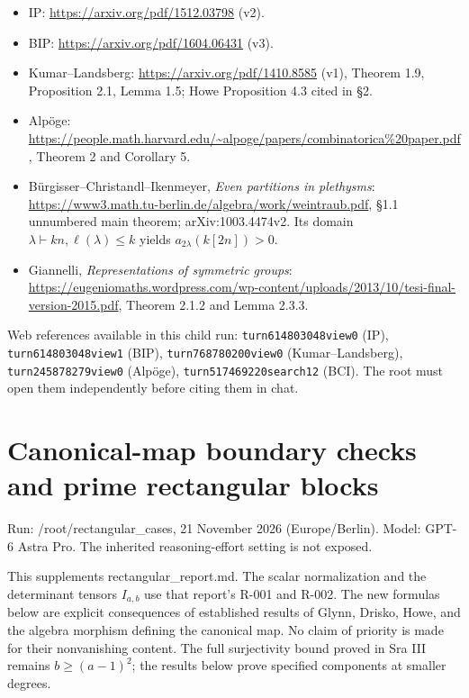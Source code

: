 \documentclass[
  10pt,
]{article}
\providecommand{\tightlist}{%
  \setlength{\itemsep}{0pt}\setlength{\parskip}{0pt}}
\providecommand{\tightlist}{\setlength{\itemsep}{0pt}\setlength{\parskip}{0pt}}
\begin{document}
\begin{itemize}
\tightlist
\item
  IP: \url{https://arxiv.org/pdf/1512.03798} (v2).
\item
  BIP: \url{https://arxiv.org/pdf/1604.06431} (v3).
\item
  Kumar--Landsberg: \url{https://arxiv.org/pdf/1410.8585} (v1), Theorem
  1.9, Proposition 2.1, Lemma 1.5; Howe Proposition 4.3 cited in §2.
\item
  Alpöge:
  \url{https://people.math.harvard.edu/~alpoge/papers/combinatorica\%20paper.pdf},
  Theorem 2 and Corollary 5.
\item
  Bürgisser--Christandl--Ikenmeyer, \emph{Even partitions in plethysms}:
  \url{https://www3.math.tu-berlin.de/algebra/work/weintraub.pdf}, §1.1
  unnumbered main theorem; arXiv:1003.4474v2. Its domain
  \(\lambda\vdash kn,\ell(\lambda)\le k\) yields
  \(a_{2\lambda}(k[2n])>0\).
\item
  Giannelli, \emph{Representations of symmetric groups}:
  \url{https://eugeniomaths.wordpress.com/wp-content/uploads/2013/10/tesi-final-version-2015.pdf},
  Theorem 2.1.2 and Lemma 2.3.3.
\end{itemize}

Web references available in this child run:
\texttt{\small turn614803048view0} (IP),
\texttt{\small turn614803048view1} (BIP),
\texttt{\small turn768780200view0} (Kumar--Landsberg),
\texttt{\small turn245878279view0} (Alpöge),
\texttt{\small turn517469220search12} (BCI). The root must open them
independently before citing them in chat.

\section{Canonical-map boundary checks and prime rectangular
blocks}\label{canonical-map-boundary-checks-and-prime-rectangular-blocks}

Run: /root/rectangular\_cases, 21 November 2026 (Europe/Berlin). Model:
GPT-6 Astra Pro. The inherited reasoning-effort setting is not exposed.

This supplements rectangular\_report.md. The scalar normalization and
the determinant tensors \(I_{a,b}\) use that report's R-001 and R-002.
The new formulas below are explicit consequences of established results
of Glynn, Drisko, Howe, and the algebra morphism defining the canonical
map. No claim of priority is made for their nonvanishing content. The
full surjectivity bound proved in Sra III remains \(b\ge(a-1)^2\); the
results below prove specified components at smaller degrees.
\end{document}
